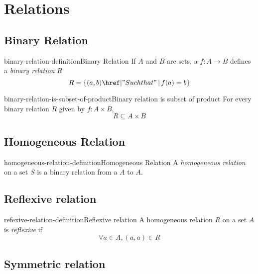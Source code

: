 \documentclass[preview]{standalone}
\begin{document}
\genpage

\section{Relations}

\subsection{Binary Relation}

\begin{snippetdefinition}{binary-relation-definition}{Binary Relation}
    If \(A\) and \(B\) are sets, a \function \(f:A\to B\)
    defines a \textit{binary relation} \(R\)
    \[
        R = \{(a,b) \suchthat f(a)=b\}
    \]
\end{snippetdefinition}

\begin{snippetcorollary}{binary-relation-is-subset-of-product}{Binary relation is subset of product}
    For every binary relation \(R\) given by \(f: A \times B\),
    \[R\subseteq A\times B\]
\end{snippetcorollary}

\subsection{Homogeneous Relation}

\begin{snippetdefinition}{homogeneous-relation-definition}{Homogeneous Relation}
    A \textit{homogeneous relation} on a set \(S\) is a binary relation
    from a \(A\) to \(A\).
\end{snippetdefinition}

\subsection{Reflexive relation}

\begin{snippetdefinition}{refexive-relation-definition}{Reflexive relation}
    A homogeneous relation \(R\) on a set \(A\) is \textit{reflexive}
    if
    \[
        \forall a\in A, (a,a) \in R
    \]
\end{snippetdefinition}

\subsection{Symmetric relation}
\end{document}
